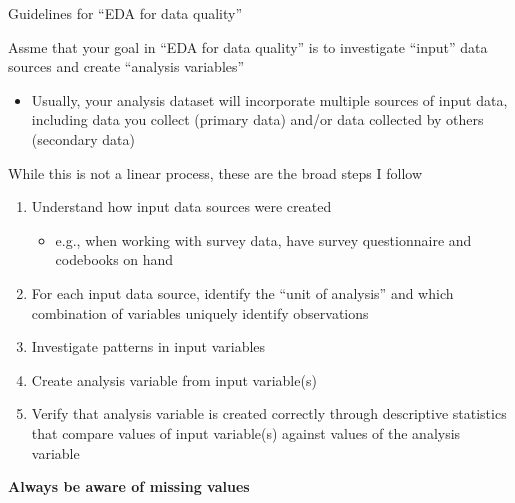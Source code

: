 \documentclass[8pt,ignorenonframetext,dvipsnames]{beamer}
\providecommand{\tightlist}{%
  \setlength{\itemsep}{0pt}\setlength{\parskip}{0pt}}
\renewcommand{\textbf}[1]{{\color{darkgray}\bfseries\fontfamily{Montserrat-TOsF}#1}}
\let\olditem\item
\renewcommand{\item}{%
  \olditem\vspace{4pt}
}
\begin{document}
\begin{frame}{Guidelines for ``EDA for data quality''}

Assme that your goal in ``EDA for data quality'' is to investigate
``input'' data sources and create ``analysis variables''

\begin{itemize}
\tightlist
\item
  Usually, your analysis dataset will incorporate multiple sources of
  input data, including data you collect (primary data) and/or data
  collected by others (secondary data)
\end{itemize}

While this is not a linear process, these are the broad steps I follow

\begin{enumerate}
\def\labelenumi{\arabic{enumi}.}
\tightlist
\item
  Understand how input data sources were created

  \begin{itemize}
  \tightlist
  \item
    e.g., when working with survey data, have survey questionnaire and
    codebooks on hand
  \end{itemize}
\item
  For each input data source, identify the ``unit of analysis'' and
  which combination of variables uniquely identify observations
\item
  Investigate patterns in input variables
\item
  Create analysis variable from input variable(s)
\item
  Verify that analysis variable is created correctly through descriptive
  statistics that compare values of input variable(s) against values of
  the analysis variable
\end{enumerate}

\textbf{Always be aware of missing values}

\end{frame}
\end{document}
